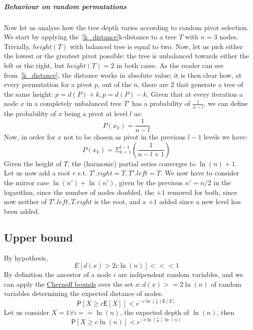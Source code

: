 \documentclass{article}
\newcommand*{\expect}{\mathsf{E}}  %
\newcommand*{\prob}{\mathsf{P}}    %
\begin{document}
\subparagraph{Behaviour on random permutations}
Now let us analyse how the tree depth varies according to random pivot selection.
We start by applying the~\ref{k_distance}k-distance to a tree $T$ with $n = 3$
nodes.
Trivially, $height(T)$ with balanced tree is equal to two.
Now, let us pick either the lowest or the greatest pivot possible: the tree
is unbalanced towards either the left or the right, but $height(T) = 2$ in
both cases.
As the reader can see from~\ref{k_distance}, the distance works in absolute
value; it is then clear how, at every permutation for a pivot $p$, out of the
$n$, there are $2$ that generate a tree of the same height:
$p = d(P) + k, p = d(P) - k$.
Given that at every iteration a node $x$ in a completely unbalanced tree $T$'
has a probability of $\frac{1}{n - i}$, we can define the probability of $x$
being a pivot at level $l$ as:
    \begin{equation}
    P(x_{k}) = \frac{1}{n - l}
    \end{equation}
Now, in order for $x$ not to be chosen as pivot in the previous $l - 1$
levels we have:
    \begin{equation}
    P(x_{k}) = \Sigma_{k = 1}^{l - 1} (\frac{1}{n - l + 1})
    \end{equation}
Given the height of $T$, the (harmonic) partial series converges to
$\ln{(n)} + 1$.
Let us now add a root $r$ s.t. $T'.right = T, T'.left = T$.
We now have to consider the mirror case $\ln{(n')} + \ln{(n')}$,
given by the previous $n' = n/2$ in the logarithm, since the number of nodes
doubled, the $+1$ removed for both, since now neither of $T'.left, T.right$
is the root, and a $+1$ added since a new level has been added.

\subsection{Upper bound}

By hypothesis,
    \begin{equation}
    E[d(x) > 2 c \ln(n)] <<< 1
    \end{equation}
By definition the ancestor of a node $i$ are indipendent random variables,
and we can apply the \href{https://en.wikipedia.org/wiki/Chernoff_bound}{Chernoff
bounds} over the set ${x: d(x) >= 2 \ln(n)}$ of random variables determining
the expected distance of nodes.
\begin{equation*}
    \prob[X \geq c \expect[X]] < e^{-c \ln(\frac{c}{e})\expect[X]}
\end{equation*}
Let us consider $X = 1 \forall i == \ln(n)$, the expected depth of $\ln(n)$,
then
\begin{equation*}
    \prob[X \geq c \ln(n)] < e^{-c \ln(\frac{c}{e})\ln(n)}
\end{equation*}
\end{document}
